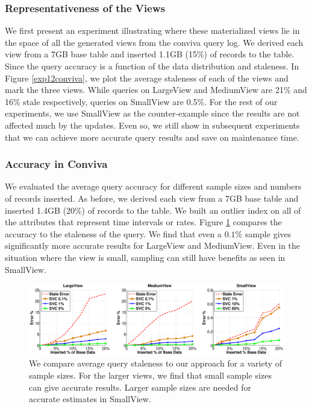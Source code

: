 \subsubsection{Representativeness of the Views}
We first present an experiment illustrating where these materialized views lie in the space of all the generated views from the conviva query log. 
We derived each view from a 7GB base table and inserted 1.1GB (15\%) of records to the table. 
Since the query accuracy is a function of the data distribution and staleness.
In Figure \ref{exp12conviva}, we plot the average staleness of each of the views and mark the three views.
While queries on LargeView and MediumView are 21\% and 16\% stale respectively, queries on SmallView are 0.5\%.
For the rest of our experiments, we use SmallView as the counter-example since the results are not affected much by the updates.
Even so, we still show in subsequent experiments that we can achieve more accurate query results and save on maintenance time.

\subsubsection{Accuracy in Conviva}
We evaluated the average query accuracy for different sample sizes and numbers of records inserted.
As before, we derived each view from a 7GB base table and inserted 1.4GB (20\%) of records to the table. 
We built an outlier index on all of the attributes that represent time intervals or rates.
Figure \ref{exp5conviva} compares the accuracy to the staleness of the query.
We find that even a $0.1\%$ sample gives significantly more accurate results for LargeView and MediumView.
Even in the situation where the view is small, sampling can still have benefits as seen in SmallView.

\begin{figure}[t]
\includegraphics[trim = 45mm 0mm 45mm 0mm, clip,width=\columnwidth]{exp/exp5-coniva-accuracy.eps}\vspace{-.5em}
 \caption{We compare average query staleness to our approach for a variety of sample sizes. For the larger views, we find that small sample sizes can give accurate results. Larger sample sizes are needed for accurate estimates in SmallView. \label{exp5conviva}}\vspace{-.5em}
\end{figure}


